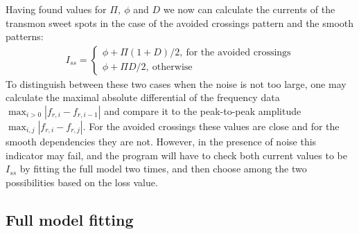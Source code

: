 \documentclass[%
 aip,
 draft,
 amsmath,amssymb,
 reprint,%
]{revtex4-1}
\begin{document}
Having found values for $\Pi,\ \phi$ and $D$ we now can calculate the currents of the transmon sweet spots in the case of the avoided crossings pattern and the smooth patterns:
\begin{align}
I_{ss} = 
\begin{cases}
 \phi + \Pi (1+D)/2,\ \text{for the avoided crossings}\\
 \phi + \Pi D/2 ,\ \text{otherwise}
\end{cases}
\end{align}
To distinguish between these two cases when the noise is not too large, one may calculate the maximal absolute differential of the frequency data $\max_{i>0} |f_{r,i} - f_{{r,i}-1}|$ and compare it to the peak-to-peak amplitude $\max_{i,j} | f_{r,i} - f_{r, j}|$. For the avoided crossings these values are close and for the smooth dependencies they are not. However, in the presence of noise this indicator may fail, and the program will have to check both current values to be $I_{ss}$ by fitting the full model two times, and then choose among the two possibilities based on the loss value.


\subsection{Full model fitting}
\end{document}
